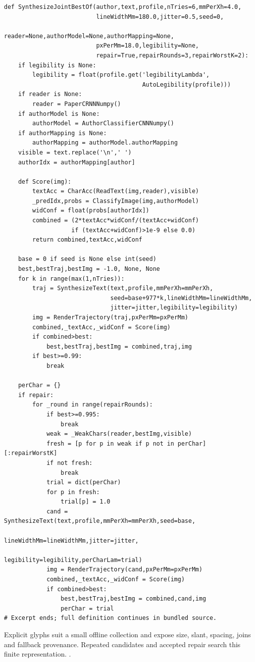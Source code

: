 \begin{lstlisting}[style=plain]
def SynthesizeJointBestOf(author,text,profile,nTries=6,mmPerXh=4.0,
                          lineWidthMm=180.0,jitter=0.5,seed=0,
                          reader=None,authorModel=None,authorMapping=None,
                          pxPerMm=18.0,legibility=None,
                          repair=True,repairRounds=3,repairWorstK=2):
    if legibility is None:
        legibility = float(profile.get('legibilityLambda',
                                       AutoLegibility(profile)))
    if reader is None:
        reader = PaperCRNNNumpy()
    if authorModel is None:
        authorModel = AuthorClassifierCNNNumpy()
    if authorMapping is None:
        authorMapping = authorModel.authorMapping
    visible = text.replace('\n',' ')
    authorIdx = authorMapping[author]

    def Score(img):
        textAcc = CharAcc(ReadText(img,reader),visible)
        _predIdx,probs = ClassifyImage(img,authorModel)
        widConf = float(probs[authorIdx])
        combined = (2*textAcc*widConf/(textAcc+widConf)
                   if (textAcc+widConf)>1e-9 else 0.0)
        return combined,textAcc,widConf

    base = 0 if seed is None else int(seed)
    best,bestTraj,bestImg = -1.0, None, None
    for k in range(max(1,nTries)):
        traj = SynthesizeText(text,profile,mmPerXh=mmPerXh,
                              seed=base+977*k,lineWidthMm=lineWidthMm,
                              jitter=jitter,legibility=legibility)
        img = RenderTrajectory(traj,pxPerMm=pxPerMm)
        combined,_textAcc,_widConf = Score(img)
        if combined>best:
            best,bestTraj,bestImg = combined,traj,img
        if best>=0.99:
            break

    perChar = {}
    if repair:
        for _round in range(repairRounds):
            if best>=0.995:
                break
            weak = _WeakChars(reader,bestImg,visible)
            fresh = [p for p in weak if p not in perChar][:repairWorstK]
            if not fresh:
                break
            trial = dict(perChar)
            for p in fresh:
                trial[p] = 1.0
            cand = SynthesizeText(text,profile,mmPerXh=mmPerXh,seed=base,
                                  lineWidthMm=lineWidthMm,jitter=jitter,
                                  legibility=legibility,perCharLam=trial)
            img = RenderTrajectory(cand,pxPerMm=pxPerMm)
            combined,_textAcc,_widConf = Score(img)
            if combined>best:
                best,bestTraj,bestImg = combined,cand,img
                perChar = trial
# Excerpt ends; full definition continues in bundled source.
\end{lstlisting}
Explicit glyphs suit a small offline collection and expose size, slant, spacing, joins and fallback provenance. Repeated candidates and accepted repair search this finite representation. \cite{haines2016,gravesgenerate,ganwriting,onedm}.


